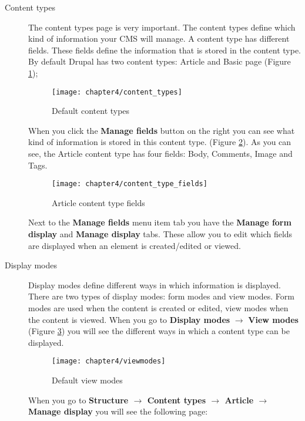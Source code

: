 \begin{description}
  	\item[Content types] The content types page is very important. The content types define which kind of information your CMS will manage. A content type has different fields. These fields define the information that is stored in the content type. 
  	By default Drupal has two content types: Article and Basic page (Figure \ref{fig:content_types});
  	
  	\begin{figure}[H]
  		\centering
  		\texttt{[image: chapter4/content\_types]}
  		\caption{Default content types}
  		\label{fig:content_types}
  	\end{figure} 
  	
  	When you click the \textbf{Manage fields} button on the right you can see what kind of information is stored in this content type. (Figure \ref{fig:content_type_fields}). As you can see, the Article content type has four fields: Body, Comments, Image and Tags. 
  	
  	\begin{figure}[H]
  		\centering
  		\texttt{[image: chapter4/content\_type\_fields]}
  		\caption{Article content type fields}
  		\label{fig:content_type_fields}
  	\end{figure} 
  	
  	Next to the \textbf{Manage fields} menu item tab you have the \textbf{Manage form display} and \textbf{Manage display} tabs. These allow you to edit which fields are displayed when an element is created/edited or viewed.
  	
  	\item[Display modes] Display modes define different ways in which information is displayed. There are two types of display modes: form modes and view modes. Form modes are used when the content is created or edited, view modes when the content is viewed. 
  	When you go to \textbf{Display modes} $\rightarrow$ \textbf{View modes} (Figure \ref{fig:viewmodes}) you will see the different ways in which a content type can be displayed. 
  	
  		\begin{figure}[H]
  			\centering
  			\texttt{[image: chapter4/viewmodes]}
  			\caption{Default view modes}
  			\label{fig:viewmodes}
  		\end{figure}
  		
  	When you go to \textbf{Structure $\rightarrow$ Content types $\rightarrow$ Article $\rightarrow$ Manage display} you will see the following page:
  	

\end{description}
